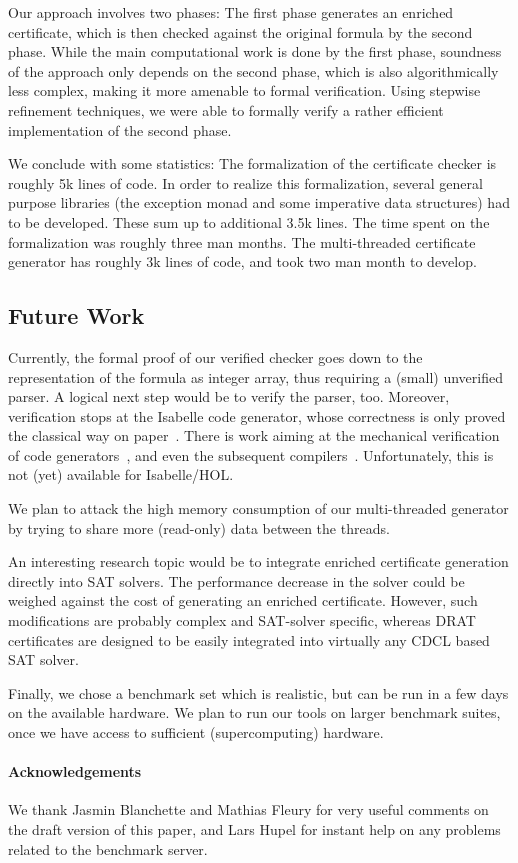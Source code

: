 \documentclass[smallcondensed]{svjour3}     %
\begin{document}
Our approach involves two phases: The first phase generates an enriched certificate, 
which is then checked against the original formula by the second phase.
While the main computational work is done by the first phase, soundness of the approach 
only depends on the second phase, which is also algorithmically less complex, making it more amenable to formal verification. 
Using stepwise refinement techniques, we were able to formally verify a rather efficient implementation of the second phase.

We conclude with some statistics: The formalization of the certificate checker is roughly 5k lines of code.
In order to realize this formalization, several general purpose libraries (\eg the exception monad and some imperative data structures) had to be developed. 
These sum up to additional 3.5k lines. The time spent on the formalization was roughly three man months. The multi-threaded certificate generator has roughly 3k 
lines of code, and took two man month to develop.

\subsection{Future Work}
Currently, the formal proof of our verified checker goes down to the representation of the formula as integer array,
thus requiring a (small) unverified parser. A logical next step would be to verify the parser, too.
Moreover, verification stops at the Isabelle code generator, whose correctness is only proved the classical way on paper~\cite{HaNi10,HKKN13}. 
There is work aiming at the mechanical verification of code generators~\cite{MO14}, and even the subsequent compilers~\cite{KMNO14}. 
Unfortunately, this is not (yet) available for Isabelle/HOL. 

We plan to attack the high memory consumption of our multi-threaded generator by trying to share more (read-only) data between the threads.

An interesting research topic would be to integrate enriched certificate generation directly into SAT solvers. 
The performance decrease in the solver could be weighed against the cost of generating an enriched certificate.
However, such modifications are probably complex and SAT-solver specific, whereas DRAT certificates are designed to be 
easily integrated into virtually any CDCL based SAT solver.

Finally, we chose a benchmark set which is realistic, but can be run in a few days on the available hardware.
We plan to run our tools on larger benchmark suites, once we have access to sufficient (supercomputing) hardware.

\paragraph{Acknowledgements} We thank Jasmin Blanchette and Mathias Fleury for very useful comments on the draft version of this paper, 
and Lars Hupel for instant help on any problems related to the benchmark server.

\clearpage



\end{document}
